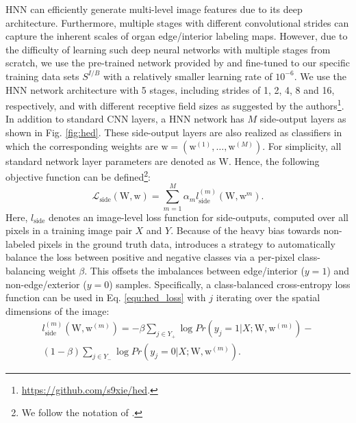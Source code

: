 \documentclass[journal]{IEEEtran}
\begin{document}
HNN can efficiently generate multi-level image features due to its deep architecture. Furthermore, multiple stages with different convolutional strides can capture the inherent scales of organ edge/interior labeling maps. However, due to the difficulty of learning such deep neural networks with multiple stages from scratch, we use the pre-trained network provided by \cite{xie2015holistically} and fine-tuned to our specific training data sets $S^{I/B}$ with a relatively smaller learning rate of $10^{-6}$. We use the HNN network architecture with 5 stages, including strides of 1, 2, 4, 8 and 16, respectively, and with different receptive field sizes as suggested by the authors\footnote{\scriptsize\url{https://github.com/s9xie/hed}.}.
In addition to standard CNN layers, a HNN network has $M$ side-output layers as shown in Fig. \ref{fig:hed}. These side-output layers are also realized as classifiers in which the corresponding weights are $\bm{\mathrm{w}} = (\bm{\mathrm{w}}^{(1)},\dots ,\bm{\mathrm{w}}^{(M )})$. For simplicity, all standard network layer parameters are denoted as $\bm{\mathrm{W}}$. Hence, the following objective function can be defined\footnote{\scriptsize We follow the notation of \cite{xie2015holistically}.}:
\begin{equation}
	\mathcal{L}_\mathrm{side}(\bm{\mathrm{W}},\bm{\mathrm{w}}) = \sum^{M}_{m=1}{\alpha_m}{l_\mathrm{side}^{(m)}}(\bm{\mathrm{W}},\bm{\mathrm{w}}^{m}).
	\label{equ:hed_loss}
\end{equation}
Here, $l_\mathrm{side}$ denotes an image-level loss function for side-outputs, computed over all pixels in a training image pair $X$ and $Y$. Because of the heavy bias towards non-labeled pixels in the ground truth data, \cite{xie2015holistically} introduces a strategy to automatically balance the loss between positive and negative classes via a per-pixel class-balancing weight $\beta$. This offsets the imbalances between edge/interior ($y=1$) and non-edge/exterior ($y=0$) samples. Specifically, a class-balanced cross-entropy loss function can be used in Eq. \eqref{equ:hed_loss} with $j$ iterating over the spatial dimensions of the image:
\begin{multline}
	l^{(m)}_\mathrm{side}(\bm{\mathrm{W}}, \bm{\mathrm{w}}^{(m)}) = - \beta \sum_{j\in Y_+}\log Pr\left(y_j=1|X;\bm{\mathrm{W}},\bm{\mathrm{w}}^{(m)}\right) - \\
	(1-\beta)\sum_{j\in Y_-}\log Pr\left(y_j=0|X;\bm{\mathrm{W}},\bm{\mathrm{w}}^{(m)}\right).
	\label{equ:hed_loss_balanced}
\end{multline}
\end{document}
